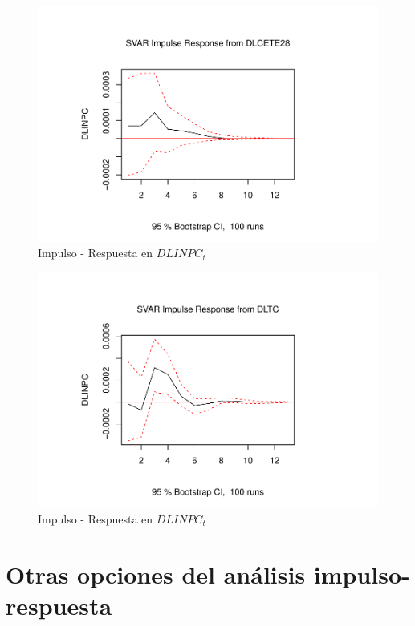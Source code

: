 \documentclass[
]{book}
\begin{document}
\begin{figure}

{\centering \includegraphics{Notas-Series-Tiempo_files/figure-latex/fig65-3} 

}

\caption{Impulso - Respuesta en $DLINPC_t$}\label{fig:fig65-3}
\end{figure}
\begin{figure}

{\centering \includegraphics{Notas-Series-Tiempo_files/figure-latex/fig65-4} 

}

\caption{Impulso - Respuesta en $DLINPC_t$}\label{fig:fig65-4}
\end{figure}

\hypertarget{otras-opciones-del-anuxe1lisis-impulso-respuesta}{%
\section{Otras opciones del análisis impulso-respuesta}\label{otras-opciones-del-anuxe1lisis-impulso-respuesta}}
\end{document}
